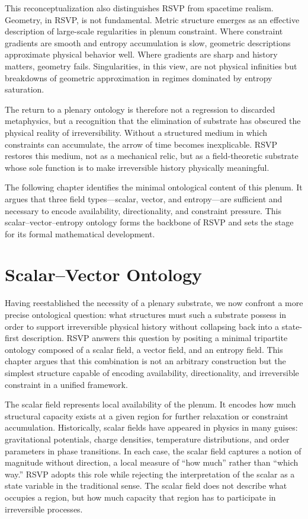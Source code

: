 \documentclass[11pt,oneside]{book}
\begin{document}
This reconceptualization also distinguishes RSVP from spacetime realism. Geometry, in RSVP, is not fundamental. Metric structure emerges as an effective description of large-scale regularities in plenum constraint. Where constraint gradients are smooth and entropy accumulation is slow, geometric descriptions approximate physical behavior well. Where gradients are sharp and history matters, geometry fails. Singularities, in this view, are not physical infinities but breakdowns of geometric approximation in regimes dominated by entropy saturation.

The return to a plenary ontology is therefore not a regression to discarded metaphysics, but a recognition that the elimination of substrate has obscured the physical reality of irreversibility. Without a structured medium in which constraints can accumulate, the arrow of time becomes inexplicable. RSVP restores this medium, not as a mechanical relic, but as a field-theoretic substrate whose sole function is to make irreversible history physically meaningful.

The following chapter identifies the minimal ontological content of this plenum. It argues that three field types—scalar, vector, and entropy—are sufficient and necessary to encode availability, directionality, and constraint pressure. This scalar–vector–entropy ontology forms the backbone of RSVP and sets the stage for its formal mathematical development.

\chapter{Scalar--Vector Ontology}

Having reestablished the necessity of a plenary substrate, we now confront a more precise ontological question: what structures must such a substrate possess in order to support irreversible physical history without collapsing back into a state-first description. RSVP answers this question by positing a minimal tripartite ontology composed of a scalar field, a vector field, and an entropy field. This chapter argues that this combination is not an arbitrary construction but the simplest structure capable of encoding availability, directionality, and irreversible constraint in a unified framework.

The scalar field represents local availability of the plenum. It encodes how much structural capacity exists at a given region for further relaxation or constraint accumulation. Historically, scalar fields have appeared in physics in many guises: gravitational potentials, charge densities, temperature distributions, and order parameters in phase transitions. In each case, the scalar field captures a notion of magnitude without direction, a local measure of “how much” rather than “which way.” RSVP adopts this role while rejecting the interpretation of the scalar as a state variable in the traditional sense. The scalar field does not describe what occupies a region, but how much capacity that region has to participate in irreversible processes.
\end{document}
